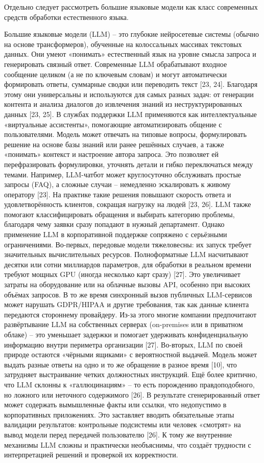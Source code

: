 \documentclass[14pt,a4paper]{extarticle}
\numberwithin{figure}{section}
\numberwithin{table}{section}
\begin{document}
Отдельно следует рассмотреть большие языковые модели как класс
современных средств обработки естественного языка.

Большие языковые модели (LLM) -- это глубокие нейросетевые системы
(обычно на основе трансформеров), обученные на колоссальных массивах
текстовых данных. Они умеют «понимать» естественный язык на уровне
смысла запроса и генерировать связный ответ. Современные LLM
обрабатывают входное сообщение целиком (а не по ключевым словам) и могут
автоматически формировать ответы, суммарные сводки или переводить текст
[23, 24]. Благодаря этому они универсальны и используются для
самых разных задач: от генерации контента и анализа диалогов до
извлечения знаний из неструктурированных данных [23, 25]. В службах
поддержки LLM применяются как интеллектуальные «виртуальные ассистенты»,
помогающие автоматизировать общение с пользователями. Модель может
отвечать на типовые вопросы, формулировать решение на основе базы знаний
или ранее решённых случаев, а также «понимать» контекст и настроение
автора запроса. Это позволяет ей перефразировать формулировки, уточнять
детали и гибко переключаться между темами. Например, LLM-чатбот может
круглосуточно обслуживать простые запросы (FAQ), а сложные случаи --
немедленно эскалировать к живому оператору [23]. На практике такие
решения повышают скорость ответа и удовлетворённость клиентов, сокращая
нагрузку на людей [23, 26]. LLM также помогают классифицировать
обращения и выбирать категорию проблемы, благодаря чему заявки сразу
попадают в нужный департамент. Однако применение LLM в корпоративной
поддержке сопряжено с серьёзными ограничениями. Во-первых, передовые
модели тяжеловесны: их запуск требует значительных вычислительных
ресурсов. Полноформатные LLM насчитывают десятки или сотни миллиардов
параметров, для обработки в реальном времени требуют мощных GPU (иногда
несколько карт сразу) [27]. Это увеличивает затраты на оборудование
или на облачные вызовы API, особенно при высоких объёмах запросов. В то
же время синхронный вызов публичных LLM-сервисов может нарушать
GDPR/HIPAA и другие требования, так как данные клиента передаются
стороннему провайдеру. Из-за этого многие компании предпочитают
развёртывание LLM на собственных серверах (on-premises или в приватном
облаке) -- это уменьшает задержки и помогает удерживать конфиденциальную
информацию внутри периметра организации [27]. Во-вторых,
LLM по своей природе остаются «чёрными ящиками» с вероятностной выдачей.
Модель может выдать разные ответы на одно и то же обращение в разное
время [10], что затрудняет выстраивание четких должностных
инструкций. Ещё более критично, что LLM склонны к «галлюцинациям» -- то
есть порождению правдоподобного, но ложного или неточного содержимого
[26]. В результате сгенерированный ответ может содержать вымышленные
факты или ссылки, что недопустимо в корпоративных приложениях. Это
заставляет вводить обязательные этапы валидации результатов: контрольные
подсистемы или человек «смотрят» на вывод модели перед передачей
пользователю [26]. К тому же внутренние механизмы LLM сложны и
практически необъяснимы, что создаёт трудности с интерпретацией решений
и проверкой их корректности.
\end{document}
